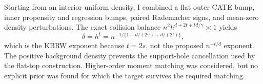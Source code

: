 Starting from an interior uniform density, I combined a flat outer CATE bump, inner propensity and regression bumps, paired Rademacher signs, and mean-zero density perturbations.  The exact collision balance \(n^2h^{d+2t+td/\gamma}\asymp1\) yields
\[
\delta=h^t=n^{-1/\{1+d/(2\gamma)+d/(2t)\}},
\]
which is the KBRW exponent because \(t=2s\), not the proposed \(n^{-t/d}\) exponent.  The positive background density prevents the support-hole cancellation used by the flat-top construction.  Higher-order moment matching was considered, but no explicit prior was found for which the target survives the required matching.